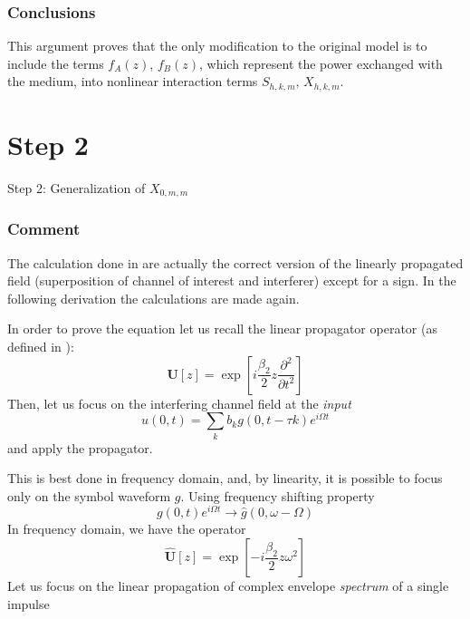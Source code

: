 \documentclass[8pt]{beamer} %
\begin{document}
\begin{frame}
    \frametitle{Conclusions}
    This argument proves that the only modification to the original model is to include the terms $f_A(z)$, $f_B(z)$, which represent the power exchanged with the medium, into nonlinear interaction terms $S_{h, k, m}, \, X_{h, k, m}$.
\end{frame}

\section{Step 2}
\begin{frame}
    \Huge{Step 2: Generalization of $X_{0, m, m}$}
\end{frame}

\begin{frame}
    \frametitle{Comment}
    The calculation done in \cite[eq. 1]{Dar_2013} are actually the correct version of the linearly propagated field (superposition of channel of interest and interferer) except for a sign. In the following derivation the calculations are made again.

    In order to prove the equation let us recall the linear propagator operator (as defined in \cite{Dar_2013}):
    \begin{equation}
        \mathbf{U}[z]=\exp \left[i \frac{\beta_{2}}{2} z \frac{\partial^{2}}{\partial t^{2}} \right]
    \end{equation}
    Then, let us focus on the interfering channel field at the \textit{input}
    \begin{equation}
        u(0, t)=\sum_{k} b_{k} g(0, t - \tau k) e^{i \Omega t}
    \end{equation}
    and apply the propagator.

    This is best done in frequency domain, and, by linearity, it is possible to focus only on the symbol waveform $g$.
    Using frequency shifting property
    \begin{equation}
        g(0, t) e^{i \Omega t} \rightarrow \hat{g}(0, \omega-\Omega)
    \end{equation} In frequency domain, we have the operator
    \begin{equation}
        \hat{\mathbf{U}}[z]=\exp \left[- i \frac{\beta_{2}}{2} z \omega^2 \right]
    \end{equation}
    Let us focus on the linear propagation of complex envelope \textit{spectrum} of a single impulse

\end{frame}
\end{document}
